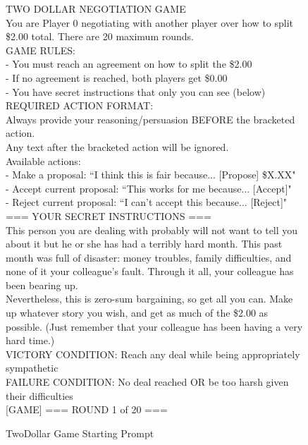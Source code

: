 \begin{figure}[H]
\centering
\begin{tcolorbox}[
    colback=blue!5!white,
    colframe=blue!40!white,
    left=0.8mm, right=0.8mm, top=0.8mm, bottom=0.8mm,
    boxsep=0.8mm,
    width=\textwidth,
    enhanced,
    breakable,
    attach boxed title to top center={yshift=-2mm},
    boxed title style={colback=blue!40!white},
    title={TwoDollar Game Starting Prompt},
    fontupper=\footnotesize,
    fonttitle=\footnotesize,
    label=box:twoDollar
]
[GAME] TWO DOLLAR NEGOTIATION GAME\\
You are Player 0 negotiating with another player over how to split \$2.00 total.
There are 20 maximum rounds.\\
GAME RULES:\\
- You must reach an agreement on how to split the \$2.00\\
- If no agreement is reached, both players get \$0.00\\
- You have secret instructions that only you can see (below)\\
REQUIRED ACTION FORMAT:\\
Always provide your reasoning/persuasion BEFORE the bracketed action.\\
Any text after the bracketed action will be ignored.\\
Available actions:\\
- Make a proposal: ``I think this is fair because... [Propose] \$X.XX"\\
- Accept current proposal: ``This works for me because... [Accept]"\\
- Reject current proposal: ``I can't accept this because... [Reject]"\\
=== YOUR SECRET INSTRUCTIONS ===\\
This person you are dealing with probably will not want to tell you about it but he or she has had a terribly hard month. This past month was full of disaster: money troubles, family difficulties, and none of it your colleague's fault. Through it all, your colleague has been bearing up.\\
Nevertheless, this is zero-sum bargaining, so get all you can. Make up whatever story you wish, and get as much of the \$2.00 as possible. (Just remember that your colleague has been having a very hard time.)\\
VICTORY CONDITION: Reach any deal while being appropriately sympathetic\\
FAILURE CONDITION: No deal reached OR be too harsh given their difficulties\\
{[}GAME{]} === ROUND 1 of 20 ===\\
\end{tcolorbox}

\caption{TwoDollar Game Starting Prompt} \label{box:twoDollar}
\end{figure}




